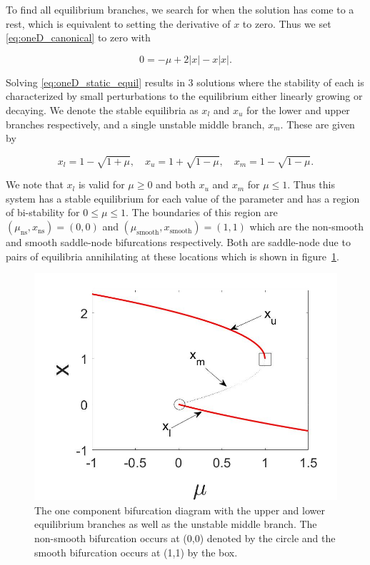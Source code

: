\indent To find all equilibrium branches, we search for when the solution has come to a rest, which is equivalent to setting the derivative of $x$ to zero. Thus we set \eqref{eq:oneD_canonical} to zero with

\begin{equation}\label{eq:oneD_static_equil}
0=-\mu +2|x|-x|x|.
\end{equation}

Solving \eqref{eq:oneD_static_equil} results in 3 solutions where the stability of each is characterized by small perturbations to the equilibrium either linearly growing or decaying. We denote the stable equilibria as $x_l$ and $x_u$ for the lower and upper branches respectively, and a single unstable middle branch, $x_{m}$. These are given by

\begin{equation*}
x_l=1-\sqrt{1+\mu},\quad x_u=1+\sqrt{1-\mu},\quad
x_{m}=1-\sqrt{1-\mu}.
\end{equation*}

\indent We note that $x_l$ is valid for $\mu\ge 0$ and both $x_u$ and $x_{m}$ for $\mu\le 1$. Thus this system has a stable equilibrium for each value of the parameter and has a region of bi-stability for $0\le \mu\le 1$. The boundaries of this region are ${(\mu_{\text{ns}},x_{\text{ns}})=(0,0)}$ and $(\mu_{\text{smooth}},x_{\text{smooth}})=(1,1)$ which are the non-smooth and smooth saddle-node bifurcations respectively. Both are saddle-node due to pairs of equilibria annihilating at these locations which is shown in figure~\ref{fig:oneD_static_bifdiagram}.

\begin{figure}[H]
\centering
\includegraphics[width=.7\textwidth]{oneD/bif_diagram.jpg}
\caption{The one component bifurcation diagram with the upper and lower equilibrium branches as well as the unstable middle branch. The non-smooth bifurcation occurs at (0,0) denoted by the circle and the smooth bifurcation occurs at (1,1) by the box. }
\label{fig:oneD_static_bifdiagram}
\end{figure}


